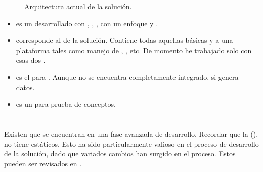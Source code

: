 \begin{figure}[H]
	\centering
	
	
	\caption{Arquitectura actual de la solución.}
	\label{cap:avances:current_architecture}
\end{figure}
	\begin{itemize}
		\item
			\textbf{\rtcom} es un \frameworkPC \ecommerce desarrollado con \meteorNAME, \nodejsNAME, \mongodbNAME, \coffeescript con un enfoque \reactive y \realTimeINT.
		\item
			\textbf{\rtcomCorePCKG} corresponde al \coreAS de la solución. Contiene todas aquellas \featuresCPT básicas y \templatesAS a una plataforma \ecommerce tales como manejo de \itemsCOM, \sessionsINT, etc. De momento he trabajado solo con esas dos \featuresCPT.
		\item
			\textbf{\rtcomGoogleanalPCKG} es el \moduleAS para \googleanalytics. Aunque no se encuentra completamente integrado, si genera datos.
		\item
			\textbf{\helloworldPCKG} es un \moduleAS para prueba de conceptos.
	\end{itemize}

\section{\dataModelAS}

Existen \dataModelsAS que se encuentran en una fase avanzada de desarrollo. Recordar que la \dataBaseDB (\mongodbNAME), no tiene \schemasDB estáticos. Esto ha sido particularmente valioso en el proceso de desarrollo de la solución, dado que variados cambios han surgido en el proceso. Estos \dataModelsAS pueden ser revisados en .

